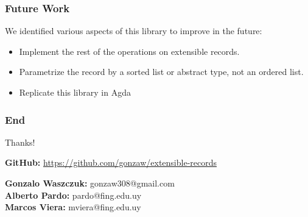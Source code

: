 \documentclass{beamer}
\begin{document}
\begin{frame}
\frametitle{Future Work}

We identified various aspects of this library to improve in the future:

\begin{itemize}
\item Implement the rest of the operations on extensible records.
\item Parametrize the record by a sorted list or abstract type, not an ordered list.
\item Replicate this library in Agda
\end{itemize}

\end{frame}

\begin{frame}
\frametitle{End}

\begin{center}
{\huge Thanks!}
\end{center}

\vfill

\vfill

\begin{center}
\textbf{GitHub:} \url{https://github.com/gonzaw/extensible-records}
\end{center}

\vfill

\begin{center}
\textbf{Gonzalo Waszczuk:} gonzaw308@gmail.com \\
\textbf{Alberto Pardo:} pardo@fing.edu.uy \\
\textbf{Marcos Viera:} mviera@fing.edu.uy
\end{center}

\end{frame}
\end{document}
